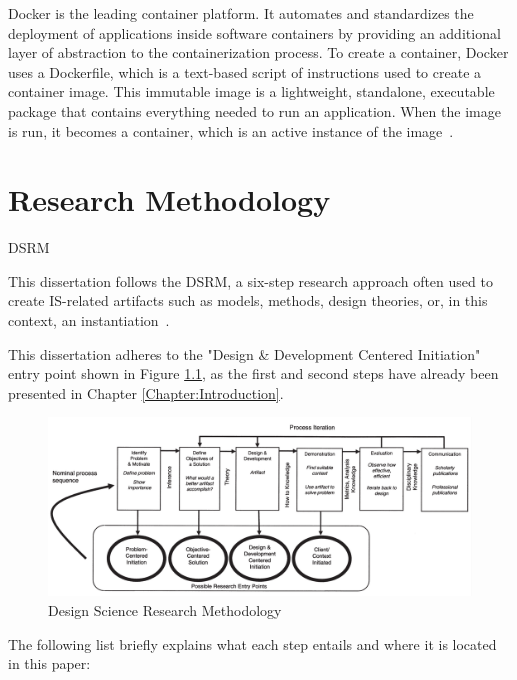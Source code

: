 \documentclass[12pt,reqno, oneside]{amsbook}
\makeatletter
\def\section{\@startsection{section}{1}%
      \z@{.5\linespacing\@plus.7\linespacing}{.25\linespacing}%
      {\normalfont\bfseries\flushleft}}
\theoremstyle{definition}
\theoremstyle{definition}
\numberwithin{section}{chapter}
\numberwithin{table}{chapter}
\numberwithin{figure}{chapter}
\makeatother
\begin{document}
Docker is the leading container platform. It automates and standardizes the deployment of applications inside software containers by providing an additional layer of abstraction to the containerization process. To create a container, Docker uses a Dockerfile, which is a text-based script of instructions used to create a container image. This immutable image is a lightweight, standalone, executable package that contains everything needed to run an application. When the image is run, it becomes a container, which is an active instance of the image~\cite{Figueira2024, Hardikar2021, Potdar2020}.


\chapter{Research Methodology}
\label{Chapter:Research_Methodology}

\section{\texorpdfstring{\ac{DSRM}}{DSRM}}

This dissertation follows the \ac{DSRM}, a six-step research approach often used to create \ac{IS}-related artifacts such as models, methods, design theories, or, in this context, an instantiation~\cite{Peffers2007}.

This dissertation adheres to the "Design \& Development Centered Initiation" entry point shown in Figure \ref{Figure:DSRM}, as the first and second steps have already been presented in Chapter \ref{Chapter:Introduction}.

\begin{figure}[H]
  \centering
  \includegraphics[width=1\linewidth]{images/DSRM_process_model.png}
  \caption{\label{Figure:DSRM}Design Science Research Methodology~\cite{Peffers2007}}
\end{figure}

The following list briefly explains what each step entails and where it is located in this paper:
\end{document}
